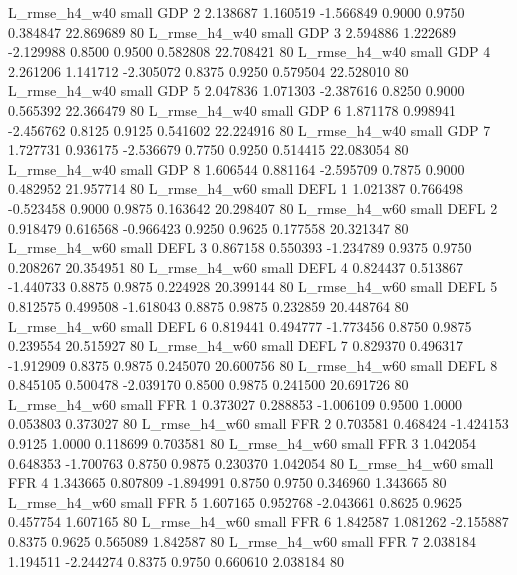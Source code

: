  L_rmse_h4_w40      small      GDP                 2 2.138687 1.160519 -1.566849 0.9000 0.9750  0.384847   22.869689 80
 L_rmse_h4_w40      small      GDP                 3 2.594886 1.222689 -2.129988 0.8500 0.9500  0.582808   22.708421 80
 L_rmse_h4_w40      small      GDP                 4 2.261206 1.141712 -2.305072 0.8375 0.9250  0.579504   22.528010 80
 L_rmse_h4_w40      small      GDP                 5 2.047836 1.071303 -2.387616 0.8250 0.9000  0.565392   22.366479 80
 L_rmse_h4_w40      small      GDP                 6 1.871178 0.998941 -2.456762 0.8125 0.9125  0.541602   22.224916 80
 L_rmse_h4_w40      small      GDP                 7 1.727731 0.936175 -2.536679 0.7750 0.9250  0.514415   22.083054 80
 L_rmse_h4_w40      small      GDP                 8 1.606544 0.881164 -2.595709 0.7875 0.9000  0.482952   21.957714 80
 L_rmse_h4_w60      small     DEFL                 1 1.021387 0.766498 -0.523458 0.9000 0.9875  0.163642   20.298407 80
 L_rmse_h4_w60      small     DEFL                 2 0.918479 0.616568 -0.966423 0.9250 0.9625  0.177558   20.321347 80
 L_rmse_h4_w60      small     DEFL                 3 0.867158 0.550393 -1.234789 0.9375 0.9750  0.208267   20.354951 80
 L_rmse_h4_w60      small     DEFL                 4 0.824437 0.513867 -1.440733 0.8875 0.9875  0.224928   20.399144 80
 L_rmse_h4_w60      small     DEFL                 5 0.812575 0.499508 -1.618043 0.8875 0.9875  0.232859   20.448764 80
 L_rmse_h4_w60      small     DEFL                 6 0.819441 0.494777 -1.773456 0.8750 0.9875  0.239554   20.515927 80
 L_rmse_h4_w60      small     DEFL                 7 0.829370 0.496317 -1.912909 0.8375 0.9875  0.245070   20.600756 80
 L_rmse_h4_w60      small     DEFL                 8 0.845105 0.500478 -2.039170 0.8500 0.9875  0.241500   20.691726 80
 L_rmse_h4_w60      small      FFR                 1 0.373027 0.288853 -1.006109 0.9500 1.0000  0.053803    0.373027 80
 L_rmse_h4_w60      small      FFR                 2 0.703581 0.468424 -1.424153 0.9125 1.0000  0.118699    0.703581 80
 L_rmse_h4_w60      small      FFR                 3 1.042054 0.648353 -1.700763 0.8750 0.9875  0.230370    1.042054 80
 L_rmse_h4_w60      small      FFR                 4 1.343665 0.807809 -1.894991 0.8750 0.9750  0.346960    1.343665 80
 L_rmse_h4_w60      small      FFR                 5 1.607165 0.952768 -2.043661 0.8625 0.9625  0.457754    1.607165 80
 L_rmse_h4_w60      small      FFR                 6 1.842587 1.081262 -2.155887 0.8375 0.9625  0.565089    1.842587 80
 L_rmse_h4_w60      small      FFR                 7 2.038184 1.194511 -2.244274 0.8375 0.9750  0.660610    2.038184 80
